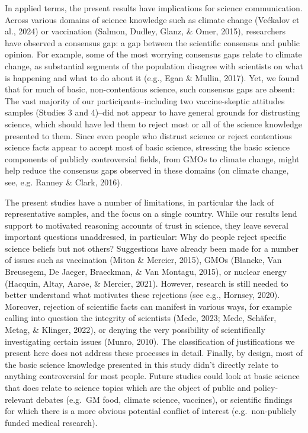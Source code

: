 \documentclass[
  doc,floatsintext]{apa6}
\begin{document}
In applied terms, the present results have implications for science communication. Across various domains of science knowledge such as climate change (Većkalov et al., 2024) or vaccination (Salmon, Dudley, Glanz, \& Omer, 2015), researchers have observed a consensus gap: a gap between the scientific consensus and public opinion. For example, some of the most worrying consensus gaps relate to climate change, as substantial segments of the population disagree with scientists on what is happening and what to do about it (e.g., Egan \& Mullin, 2017). Yet, we found that for much of basic, non-contentious science, such consensus gaps are absent: The vast majority of our participants--including two vaccine-skeptic attitudes samples (Studies 3 and 4)--did not appear to have general grounds for distrusting science, which should have led them to reject most or all of the science knowledge presented to them. Since even people who distrust science or reject contentious science facts appear to accept most of basic science, stressing the basic science components of publicly controversial fields, from GMOs to climate change, might help reduce the consensus gaps observed in these domains (on climate change, see, e.g. Ranney \& Clark, 2016).

The present studies have a number of limitations, in particular the lack of representative samples, and the focus on a single country. While our results lend support to motivated reasoning accounts of trust in science, they leave several important questions unaddressed, in particular: Why do people reject specific science beliefs but not others? Suggestions have already been made for a number of issues such as vaccination (Miton \& Mercier, 2015), GMOs (Blancke, Van Breusegem, De Jaeger, Braeckman, \& Van Montagu, 2015), or nuclear energy (Hacquin, Altay, Aarøe, \& Mercier, 2021). However, research is still needed to better understand what motivates these rejections (see e.g., Hornsey, 2020). Moreover, rejection of scientific facts can manifest in various ways, for example calling into question the integrity of scientists (Mede, 2023; Mede, Schäfer, Metag, \& Klinger, 2022), or denying the very possibility of scientifically investigating certain issues (Munro, 2010). The classification of justifications we present here does not address these processes in detail. Finally, by design, most of the basic science knowledge presented in this study didn't directly relate to anything controversial for most people. Future studies could look at basic science that does relate to science topics which are the object of public and policy-relevant debates (e.g.~GM food, climate science, vaccines), or scientific findings for which there is a more obvious potential conflict of interest (e.g.~non-publicly funded medical research).
\end{document}
